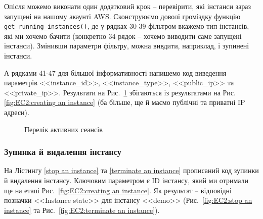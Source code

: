 \documentclass[a4paper,14pt]{extarticle} %
\begin{document}
Опісля можемо виконати один додатковий крок -- перевірити, які інстанси зараз запущені на нашому акаунті AWS. 
Сконструюємо доволі громіздку функцію \texttt{get\_running\_instances()}, де у рядках 30-39 фільтром вкажемо 
тип інстансів, які ми хочемо бачити (конкретно 34 рядок -- хочемо виводити саме запущені інстанси). Змінивши 
параметри фільтру, можна вивдити, наприклад, і зупинені інстанси.

А рядками 41-47 для більшої інформативності напишемо код виведення параметрів <<instance\_id>>, <<instance\_type>>, 
<<public\_ip>> та <<private\_ip>>. Результати на Рис.~\ref{fig:EC2:active instances} збігаються із результатами 
на Рис. \ref{fig:EC2:creating an instance} (ба більше, ще й маємо публічні та приватні IP адреси).



\begin{figure}[H]
    \caption{Перелік активних сеансів}
    \label{fig:EC2:active instances}
\end{figure}

\subsubsection*{Зупинка й видалення інстансу}

На Лістингу \ref{stop an instance} та \ref{terminate an instance} прописаний код зупинки й видалення інстансу. 
Ключовим параметром є ID інстансу, який ми отримали ще на етапі Рис.~\ref{fig:EC2:creating an instance}. 
Як результат -- відповідні позначки <<Instance state>> для інстансу <<demo>> 
(Рис.~\ref{fig:EC2:stop an instance} та Рис.~\ref{fig:EC2:terminate an instance}).


\end{document}
